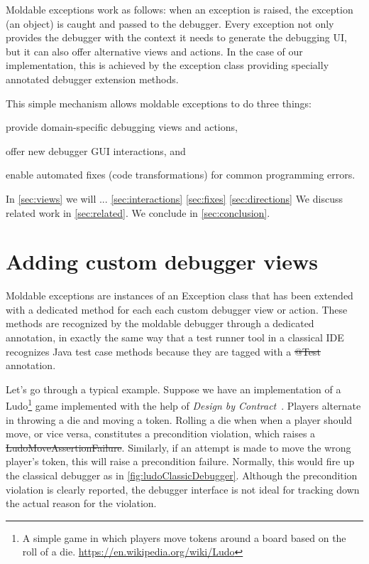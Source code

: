 \documentclass[sigplan,anonymous,review,10pt]{acmart}
\begin{document}
Moldable exceptions work as follows: when an exception is raised, the exception (an object) is caught and passed to the debugger.
Every exception not only provides the debugger with the context it needs to generate the debugging UI, but it can also offer alternative views and actions.
In the case of our implementation, this is achieved by the exception class providing specially annotated debugger extension methods.

This simple mechanism allows moldable exceptions to do three things:
\begin{inparaenum}[(i)]
	\item provide domain-specific debugging views and actions,
	\item offer new debugger GUI interactions, and
	\item enable automated fixes (code transformations) for common programming errors.
\end{inparaenum}    

In \autoref{sec:views} we will ...
\autoref{sec:interactions}
\autoref{sec:fixes}
\autoref{sec:directions}
We discuss related work in \autoref{sec:related}.
We conclude in \autoref{sec:conclusion}.

\section{Adding custom debugger views}\label{sec:views}

Moldable exceptions are instances of an Exception class that has been extended with a dedicated method for each each custom debugger view or action.
These methods are recognized by the moldable debugger through a dedicated annotation, in exactly the same way that a test runner tool in a classical IDE recognizes Java test case methods because they are tagged with a \st{@Test} annotation.

Let's go through a typical example.
Suppose we have an implementation of a Ludo\footnote{A simple game in which players move tokens around a board based on the roll of a die.
\url{https://en.wikipedia.org/wiki/Ludo}} game implemented with the help of \emph{Design by Contract}~\cite{Meye92b}.
Players alternate in throwing a die and moving a token.
Rolling a die when when a player should move, or vice versa, constitutes a precondition violation, which raises a \st{LudoMoveAssertionFailure}.
Similarly, if an attempt is made to move the wrong player's token, this will raise a precondition failure.
Normally, this would fire up the classical debugger as in \autoref{fig:ludoClassicDebugger}.
Although the precondition violation is clearly reported, the debugger interface is not ideal for tracking down the actual reason for the violation.
\end{document}
